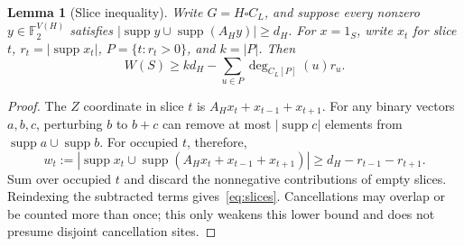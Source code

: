 \documentclass[10pt]{article}
\newtheorem{lemma}[theorem]{Lemma}
\newcommand{\supp}{\operatorname{supp}}
\newcommand{\F}{\mathbb F_2}
\begin{document}
\begin{lemma}[Slice inequality]\label{lem:slices}
Write $G=H\square C_L$, and suppose every nonzero $y\in\F^{V(H)}$ satisfies $|\supp y\cup\supp(A_Hy)|\ge d_H$. For $x=1_S$, write $x_t$ for slice $t$, $r_t=|\supp x_t|$, $P=\{t:r_t>0\}$, and $k=|P|$. Then
\begin{equation}\label{eq:slices}
 W(S)\ge k d_H-\sum_{u\in P}\deg_{C_L[P]}(u)r_u.
\end{equation}
\end{lemma}
\begin{proof}
The $Z$ coordinate in slice $t$ is $A_Hx_t+x_{t-1}+x_{t+1}$. For any binary vectors $a,b,c$, perturbing $b$ to $b+c$ can remove at most $|\supp c|$ elements from $\supp a\cup\supp b$. For occupied $t$, therefore,
\[
 w_t:=|\supp x_t\cup\supp(A_Hx_t+x_{t-1}+x_{t+1})|
 \ge d_H-r_{t-1}-r_{t+1}.
\]
Sum over occupied $t$ and discard the nonnegative contributions of empty slices. Reindexing the subtracted terms gives~\eqref{eq:slices}. Cancellations may overlap or be counted more than once; this only weakens this lower bound and does not presume disjoint cancellation sites.
\end{proof}
\end{document}
